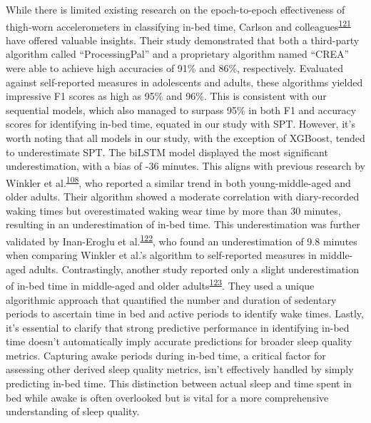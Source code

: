 \documentclass[
  10pt,
]{scrbook}
\begin{document}
While there is limited existing research on the epoch-to-epoch
effectiveness of thigh-worn accelerometers in classifying in-bed time,
Carlson and
colleagues\textsuperscript{\protect\hyperlink{ref-carlson_validity_2021}{121}}
have offered valuable insights. Their study demonstrated that both a
third-party algorithm called ``ProcessingPal'' and a proprietary
algorithm named ``CREA'' were able to achieve high accuracies of 91\%
and 86\%, respectively. Evaluated against self-reported measures in
adolescents and adults, these algorithms yielded impressive F1 scores as
high as 95\% and 96\%. This is consistent with our sequential models,
which also managed to surpass 95\% in both F1 and accuracy scores for
identifying in-bed time, equated in our study with SPT. However, it's
worth noting that all models in our study, with the exception of
XGBoost, tended to underestimate SPT. The biLSTM model displayed the
most significant underestimation, with a bias of -36 minutes. This
aligns with previous research by Winkler et
al.\textsuperscript{\protect\hyperlink{ref-winkler_identifying_2016}{108}},
who reported a similar trend in both young-middle-aged and older adults.
Their algorithm showed a moderate correlation with diary-recorded waking
times but overestimated waking wear time by more than 30 minutes,
resulting in an underestimation of in-bed time. This underestimation was
further validated by Inan-Eroglu et
al.\textsuperscript{\protect\hyperlink{ref-inan-eroglu_comparison_2021}{122}},
who found an underestimation of 9.8 minutes when comparing Winkler et
al.'s algorithm to self-reported measures in middle-aged adults.
Contrastingly, another study reported only a slight underestimation of
in-bed time in middle-aged and older
adults\textsuperscript{\protect\hyperlink{ref-van_der_berg_identifying_2016}{123}}.
They used a unique algorithmic approach that quantified the number and
duration of sedentary periods to ascertain time in bed and active
periods to identify wake times. Lastly, it's essential to clarify that
strong predictive performance in identifying in-bed time doesn't
automatically imply accurate predictions for broader sleep quality
metrics. Capturing awake periods during in-bed time, a critical factor
for assessing other derived sleep quality metrics, isn't effectively
handled by simply predicting in-bed time. This distinction between
actual sleep and time spent in bed while awake is often overlooked but
is vital for a more comprehensive understanding of sleep quality.
\end{document}
